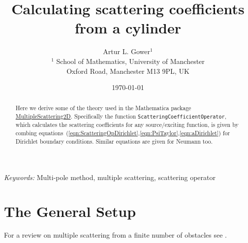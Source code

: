 \documentclass[ 12pt, a4paper]{article}
\begin{document}
\title{Calculating scattering coefficients from a cylinder}
\author{
Artur L. Gower$^{1}$  \\[12pt]
$^1$ School of Mathematics, University of Manchester \\
Oxford Road, Manchester M13 9PL, UK
}
\date{\today}
\maketitle

\begin{abstract}
Here we derive some of the theory used in the Mathematica package  \href{https://github.com/arturgower/MultipleScattering-Mathematica}{MultipleScattering2D}. Specifically the function \texttt{ScatteringCoefficientOperator}, which calculates the scattering coefficients for any source/exciting function, is given by combing equations~(\ref{eqn:ScatteringOpDirichlet},\ref{eqn:PsiTaylor},\ref{eqn:aDirichlet}) for Dirichlet boundary conditions. Similar equations are given for Neumann too.
\end{abstract}

\noindent
{\textit{Keywords:} Multi-pole method, multiple scattering, scattering operator }



\section{The General Setup}
For a review on multiple scattering from a finite number of obstacles see \cite{martin_2006}.
\end{document}
